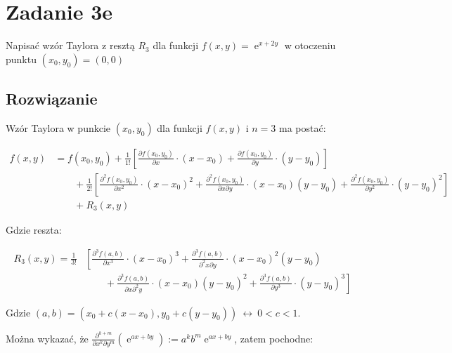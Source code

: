 \documentclass{article}
\newcommand{\for}{\ \leftrightarrow\ }
\newcommand{\partderiv}[2]{\frac{\partial #1}{\partial #2}}
\DeclareMathOperator{\?}{?}
\DeclareMathOperator{\e}{e}
\begin{document}
\section*{Zadanie 3e}

Napisać wzór Taylora z resztą $R_3$ dla funkcji $f(x,y) = \e^{x+2y}$
w otoczeniu punktu ${(x_0, y_0) = (0,0)}$

\subsection*{Rozwiązanie}

Wzór Taylora w punkcie $(x_0,y_0)$ dla funkcji $f(x,y)$ i $n=3$ ma postać:

\begin{equation*}
   \begin{aligned}
      f(x,y) &= f(x_0, y_0) + \frac{1}{1!}\left[ \partderiv{f(x_0,y_0)}{x} \cdot (x-x_0) +\partderiv{f(x_0,y_0)}{y} \cdot (y-y_0) \right] \\
      &\qquad + \frac{1}{2!}\left[
         \frac{\partial^2 f(x_0,y_0)}{\partial x^2} \cdot (x-x_0)^2
         + \frac{\partial^2 f(x_0,y_0)}{\partial x \partial y} \cdot (x-x_0)(y-y_0)
         + \frac{\partial^2 f(x_0,y_0)}{\partial y^2} \cdot (y-y_0)^2
         \right] \\[0.5em]
      &\qquad + R_3(x,y)
   \end{aligned}
\end{equation*}

Gdzie reszta:

\begin{equation*}
   \begin{aligned}
      R_3(x,y) =
      \frac{1}{3!} & \left[
         \frac{\partial^3 f(a,b)}{\partial x^3} \cdot (x-x_0)^3 \right.
         + \frac{\partial^3 f(a,b)}{\partial^2 x \partial y} \cdot (x-x_0)^2(y-y_0) \\
         &\qquad + \frac{\partial^3 f(a,b)}{\partial x \partial^2 y} \cdot (x-x_0)(y-y_0)^2
         + \left. \frac{\partial^3 f(a,b)}{\partial y^3} \cdot (y-y_0)^3
         \right]
   \end{aligned}
\end{equation*}

Gdzie ${(a,b) = (x_0 + c(x-x_0), y_0 + c(y-y_0)) \for 0 < c < 1}$.

\vspace{2em}

Można wykazać, że
$ \displaystyle
\frac{\partial^{k+m}}{\partial x^k \partial y^m}(\e^{ax + by}) := a^k b^m \e^{ax + by}
$, zatem pochodne:
\end{document}
